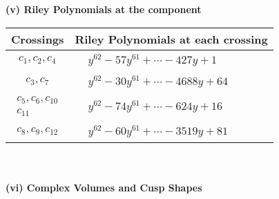 \documentclass[1p]{elsarticle_modified}
\theoremstyle{definition}
\begin{document}
\newpage\renewcommand{\arraystretch}{1}
\flushleft \textbf{(v) Riley Polynomials at the component}\newline \\
\begin{tabular}{m{50pt}|m{274pt}}
Crossings & \hspace{64pt}Riley Polynomials at each crossing \\
\hline $$\begin{aligned}c_{1},c_{2},c_{4}\end{aligned}$$&$\begin{aligned}
&y^{62}-57 y^{61}+\cdots-427 y+1
\end{aligned}$\\
\hline $$\begin{aligned}c_{3},c_{7}\end{aligned}$$&$\begin{aligned}
&y^{62}-30 y^{61}+\cdots-4688 y+64
\end{aligned}$\\
\hline $$\begin{aligned}c_{5},c_{6},c_{10}\\c_{11}\end{aligned}$$&$\begin{aligned}
&y^{62}-74 y^{61}+\cdots-624 y+16
\end{aligned}$\\
\hline $$\begin{aligned}c_{8},c_{9},c_{12}\end{aligned}$$&$\begin{aligned}
&y^{62}-60 y^{61}+\cdots-3519 y+81
\end{aligned}$\\
\hline
\end{tabular}\\~\\
\newpage\flushleft \textbf{(vi) Complex Volumes and Cusp Shapes}
\end{document}
